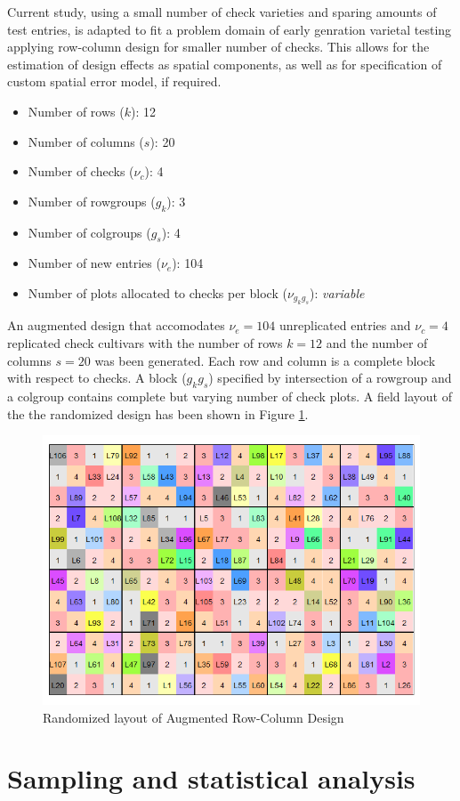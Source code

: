 \documentclass[12pt,oneside]{dukestatscithesis} %
\begin{document}
Current study, using a small number of check varieties and sparing amounts of test entries, is adapted to fit a problem domain of early genration varietal testing applying row-column design for smaller number of checks. This allows for the estimation of design effects as spatial components, as well as for specification of custom spatial error model, if required.
\begin{itemize}
\item
  Number of rows (\(k\)): 12
\item
  Number of columns (\(s\)): 20
\item
  Number of checks (\(\nu_{\textit{c}}\)): 4
\item
  Number of rowgroups (\(g_k\)): 3
\item
  Number of colgroups (\(g_s\)): 4
\item
  Number of new entries (\(\nu_{\textit{e}}\)): 104
\item
  Number of plots allocated to checks per block (\(\nu_{g_{k}g_{s}}\)): \emph{variable}
\end{itemize}
An augmented design that accomodates \(\nu_{\textit{e}}=104\) unreplicated entries and \(\nu_{\textit{c}}=4\) replicated check cultivars with the number of rows \(\textit{k} = 12\) and the number of columns \(\textit{s} = 20\) was been generated. Each row and column is a complete block with respect to checks. A block (\(g_{k}g_{s}\)) specified by intersection of a rowgroup and a colgroup contains complete but varying number of check plots. A field layout of the the randomized design has been shown in Figure \ref{fig:augmented-layout}.
\begin{figure}

{\centering \includegraphics[width=0.9\linewidth]{../images/design_layout} 

}

\caption{Randomized layout of Augmented Row-Column Design}\label{fig:augmented-layout}
\end{figure}
\hypertarget{sampling-and-statistical-analysis}{%
\section{Sampling and statistical analysis}\label{sampling-and-statistical-analysis}}
\end{document}
